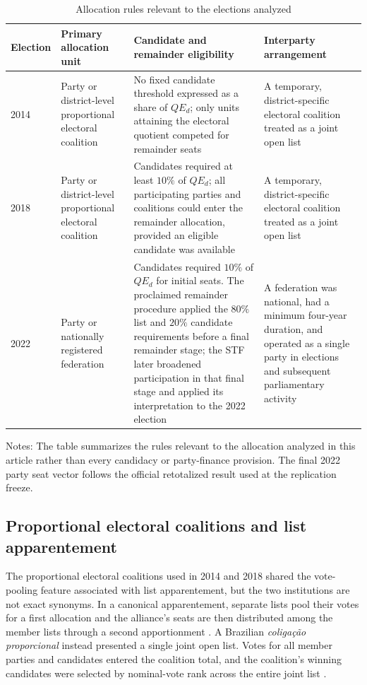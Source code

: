 \documentclass[11pt]{article}
\begin{document}
\begin{table}[htbp]
\centering
\caption{Allocation rules relevant to the elections analyzed}
\label{tab:allocation-rules}
\footnotesize
\renewcommand{\arraystretch}{1.15}
\begin{tabularx}{\textwidth}{@{}lXXX@{}}
\toprule
Election & Primary allocation unit & Candidate and remainder eligibility
& Interparty arrangement \\
\midrule
2014
& Party or district-level proportional electoral coalition
& No fixed candidate threshold expressed as a share of \(QE_d\);
only units attaining the electoral quotient competed for remainder seats
& A temporary, district-specific electoral coalition treated as a joint open list \\

2018
& Party or district-level proportional electoral coalition
& Candidates required at least \(10\%\) of \(QE_d\); all participating
parties and coalitions could enter the remainder allocation, provided an
eligible candidate was available
& A temporary, district-specific electoral coalition treated as a joint open list \\

2022
& Party or nationally registered federation
& Candidates required \(10\%\) of \(QE_d\) for initial seats. The proclaimed
remainder procedure applied the \(80\%\) list and \(20\%\) candidate
requirements before a final remainder stage; the STF later broadened
participation in that final stage and applied its interpretation to the 2022
election
& A federation was national, had a minimum four-year duration, and operated
as a single party in elections and subsequent parliamentary activity \\
\bottomrule
\end{tabularx}
\begin{flushleft}
\scriptsize
Notes: The table summarizes the rules relevant to the allocation analyzed in
this article rather than every candidacy or party-finance provision.
The final 2022 party seat vector follows the official retotalized result used
at the replication freeze.
\end{flushleft}
\end{table}

\subsection{Proportional electoral coalitions and list apparentement}

The proportional electoral coalitions used in 2014 and 2018 shared the
vote-pooling feature associated with list apparentement, but the two
institutions are not exact synonyms. In a canonical apparentement, separate
lists pool their votes for a first allocation and the alliance's seats are then
distributed among the member lists through a second apportionment
\parencite{pukelsheimLeutgaeb2013apparentements}. A Brazilian
\emph{coligação proporcional} instead presented a single joint open list.
Votes for all member parties and candidates entered the coalition total, and
the coalition's winning candidates were selected by nominal-vote rank across
the entire joint list \parencite{nicolau2006openlist}.
\end{document}
